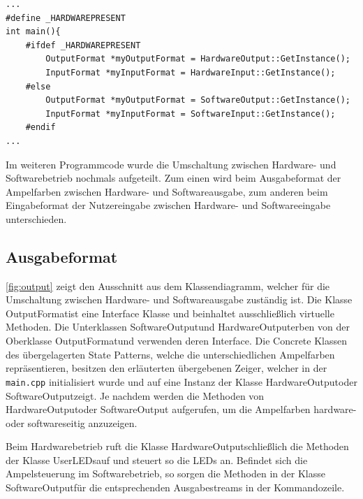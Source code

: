 \begin{lstlisting}[style=myC,caption={main.cpp - Hardwarebetrieb oder Softwarebetrieb},label={codeauszug:HWSW},captionpos=b]
...
#define _HARDWAREPRESENT
int main(){
	#ifdef _HARDWAREPRESENT
		OutputFormat *myOutputFormat = HardwareOutput::GetInstance();
		InputFormat *myInputFormat = HardwareInput::GetInstance();
	#else
		OutputFormat *myOutputFormat = SoftwareOutput::GetInstance();
		InputFormat *myInputFormat = SoftwareInput::GetInstance();
	#endif
...
\end{lstlisting}

Im weiteren Programmcode wurde die Umschaltung zwischen Hardware- und Softwarebetrieb nochmals aufgeteilt. Zum einen wird beim Ausgabeformat der Ampelfarben zwischen Hardware- und Softwareausgabe, zum anderen beim Eingabeformat der Nutzereingabe zwischen Hardware- und Softwareeingabe unterschieden.
\subsection{Ausgabeformat}
\autoref{fig:output} zeigt den Ausschnitt aus dem Klassendiagramm, welcher für die Umschaltung zwischen Hardware- und Softwareausgabe zuständig ist.
Die Klasse \glqq OutputFormat\grqq\:ist eine Interface Klasse und beinhaltet ausschließlich virtuelle Methoden. Die Unterklassen \glqq SoftwareOutput\grqq\:und \glqq HardwareOutput\grqq\:erben von der Oberklasse \glqq OutputFormat\grqq\:und verwenden deren Interface. 
Die Concrete Klassen des übergelagerten State Patterns, welche die unterschiedlichen Ampelfarben repräsentieren, besitzen den erläuterten übergebenen Zeiger, welcher in der \:\texttt{main.cpp}\: initialisiert wurde und auf eine Instanz der Klasse \glqq HardwareOutput\grqq\:oder \glqq SoftwareOutput\grqq\:zeigt. Je nachdem werden die Methoden von \glqq HardwareOutput\grqq\:oder \glqq SoftwareOutput\grqq\: aufgerufen, um die Ampelfarben hardware- oder softwareseitig anzuzeigen.

 Beim Hardwarebetrieb ruft die Klasse \glqq HardwareOutput\grqq\:schließlich die Methoden der Klasse \glqq UserLEDs\grqq\:auf und steuert so die LEDs an. Befindet sich die Ampelsteuerung im Softwarebetrieb, so sorgen die Methoden in der Klasse \glqq SoftwareOutput\grqq\:für die entsprechenden Ausgabestreams in der Kommandozeile.\\

